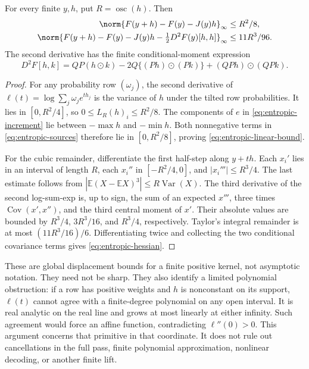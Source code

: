 \begin{theorem}
\label{thm:entropic-remainders}
For every finite $y,h$, put $R=\operatorname{osc}(h)$. Then
\begin{align}
 \norm{F(y+h)-F(y)-J(y)h}_\infty&\leq R^2/8,
 \label{eq:entropic-linear-bound}\\
 \norm{F(y+h)-F(y)-J(y)h-\tfrac12D^2F(y)[h,h]}_\infty
 &\leq 11R^3/96.
 \label{eq:entropic-quadratic-bound}
\end{align}
The second derivative has the finite conditional-moment expression
\begin{equation}
 D^2F[h,k]=QP(h\odot k)-2Q\{(Ph)\odot(Pk)\}
                    +(QPh)\odot(QPk).
 \label{eq:entropic-hessian}
\end{equation}
\end{theorem}
\begin{proof}
For any probability row $(\omega_j)$, the second derivative of
$\ell(t)=\log\sum_j\omega_je^{th_j}$ is the variance of $h$ under the
tilted row probabilities. It lies in $[0,R^2/4]$, so
$0\leq L_R(h)_i\leq R^2/8$. The components of $e$ in
\eqref{eq:entropic-increment} lie between $-\max h$ and $-\min h$.
Both nonnegative terms in \eqref{eq:entropic-sources} therefore lie in
$[0,R^2/8]$, proving \eqref{eq:entropic-linear-bound}.

For the cubic remainder, differentiate the first half-step along $y+th$.
Each $x_i'$ lies in an interval of length $R$, each $x_i''$ in
$[-R^2/4,0]$, and $|x_i'''|\leq R^3/4$. The last estimate follows from
$|\mathbb E(X-\mathbb EX)^3|\leq R\operatorname{Var}(X)$.
The third derivative of the second log-sum-exp is, up to sign, the sum
of an expected $x'''$, three times $\operatorname{Cov}(x',x'')$, and the
third central moment of $x'$. Their absolute values are bounded by
$R^3/4$, $3R^3/16$, and $R^3/4$, respectively. Taylor's integral remainder
is at most $(11R^3/16)/6$. Differentiating twice and collecting the two
conditional covariance terms gives \eqref{eq:entropic-hessian}.
\end{proof}

These are global displacement bounds for a finite positive kernel, not
asymptotic notation. They need not be sharp. They also identify a limited
polynomial obstruction: if a row has positive weights and $h$ is nonconstant
on its support, $\ell(t)$ cannot agree with a finite-degree polynomial on
any open interval. It is real analytic on the real line and grows at most
linearly at either infinity. Such agreement would force an affine function,
contradicting $\ell''(0)>0$. This argument concerns that primitive in that
coordinate. It does not rule out cancellations in the full pass, finite
polynomial approximation, nonlinear decoding, or another finite lift.

